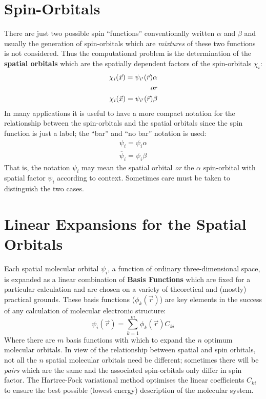 \section{\sf Spin-Orbitals}
\label{spinorb}
There are just two possible spin ``functions'' conventionally
written $\alpha$ and $\beta$ and usually the
generation of spin-orbitals which are {\em mixtures} of these two functions
is not considered.
Thus the computational problem is the determination of the
{\bf spatial orbitals} which are the spatially dependent factors
of the spin-orbitals $\chi_i$:
\begin{eqnarray*}
\chi_i (\vec{x}) = \psi_{i'} (\vec{r}) \alpha \\
{\mbox \rm or  }\\
\chi_i (\vec{x}) = \psi_{i'} (\vec{r}) \beta
\label{spaceorb}
\end{eqnarray*}
In many applications it is useful to have a more compact notation
for the relationship between the spin-orbitals and the
spatial orbitals since the spin function is just  a label; the
``bar'' and ``no bar'' notation is used:
\begin{eqnarray*}
\psi_i = \psi_i \alpha \\
\overline{\psi}_i = \psi_i \beta
\end{eqnarray*}
That is, the notation $\psi_i$ may mean the spatial orbital
{\em or } the $\alpha$ spin-orbital with spatial factor $\psi_i$
according to context. Sometimes care must be taken to 
distinguish the two cases.
\section{\sf Linear Expansions for the Spatial Orbitals}
Each  spatial molecular orbital $\psi_i$, a function of ordinary 
three-dimensional space,
is expanded as a linear combination of {\bf Basis
Functions} which are fixed for a particular calculation and
are chosen on a variety of theoretical and (mostly) practical
grounds. These basis functions ($\phi_k (\vec{r})$) are key
elements in the success of any calculation of molecular electronic
structure:
\begin{equation}
\psi_i (\vec{r}) = \sum_{k=1}^{m} { \phi_k (\vec{r}) C_{ki} }
\label{lcao}
\end{equation}
Where there are $m$ basis functions with which to expand
the $n$ optimum molecular orbitals. In view of the relationship between
spatial and spin orbitals, not all the $n$ spatial molecular orbitals
need be different; sometimes there will be {\em pairs} which
are the same and the associated spin-orbitals only differ in
spin factor.
The Hartree-Fock variational method optimises the linear
coefficients $C_{ki}$ to ensure the best possible (lowest energy)
description of the molecular system.

